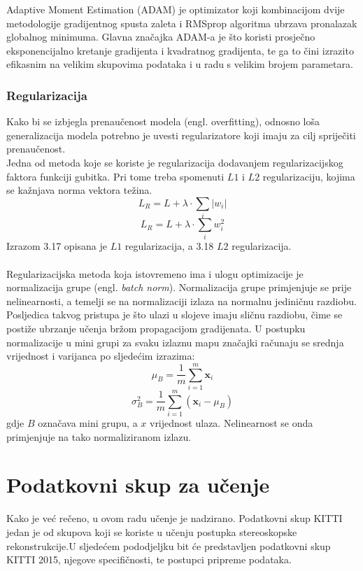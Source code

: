 \documentclass[times, utf8, zavrsni, numeric]{fer}
\begin{document}
Adaptive Moment Estimation (ADAM) je optimizator koji kombinacijom dvije metodologije gradijentnog spusta zaleta i RMSprop algoritma ubrzava pronalazak globalnog minimuma. Glavna značajka ADAM-a je što koristi prosječno eksponencijalno kretanje gradijenta i kvadratnog gradijenta, te ga to čini izrazito efikasnim na velikim skupovima podataka i u radu s velikim brojem parametara\cite{adam}.
\subsection{Regularizacija}
Kako bi se izbjegla prenaučenost modela (engl. overfitting), odnosno loša generalizacija modela potrebno je uvesti regularizatore koji imaju za cilj spriječiti prenaučenost.\\
Jedna od metoda koje se koriste je regularizacija dodavanjem regularizacijskog faktora funkciji gubitka. Pri tome treba spomenuti $L1$ i $L2$ regularizaciju, kojima se kažnjava norma vektora težina.
\begin{equation}
L_{R}= L + \lambda \cdot \sum_{i} |w_{i}|
\label{eq:Aktivacija}
\end{equation}
\begin{equation}
L_{R}= L + \lambda \cdot \sum_{i} w_{i}^2
\label{eq:Aktivacija}
\end{equation}
Izrazom 3.17 opisana je $L1$ regularizacija, a 3.18 $L2$ regularizacija.\\ \\
Regularizacijska metoda koja istovremeno ima i ulogu optimizacije je normalizacija grupe (engl. \textit{batch norm}). Normalizacija grupe primjenjuje se prije nelinearnosti, a temelji se na normalizaciji izlaza na normalnu jediničnu razdiobu. Posljedica takvog pristupa je što ulazi u slojeve imaju sličnu razdiobu, čime se postiže ubrzanje učenja bržom propagacijom gradijenata.
U postupku normalizacije u mini grupi za svaku izlaznu mapu značajki računaju se srednja vrijednost i varijanca po sljedećim izrazima:
\begin{equation}
\mu _{B} = \frac{1}{m}\sum_{i=1}^{m}\textbf{x}_{i}
\label{eq:Aktivacija}
\end{equation}
\begin{equation}
\sigma^{2} _{B} = \frac{1}{m}\sum_{i=1}^{m}\left(\textbf{x}_{i} - \mu_{B} \right)
\label{eq:Aktivacija}
\end{equation}
gdje $B$ označava mini grupu, a $x$ vrijednost ulaza.
Nelinearnost se onda primjenjuje na tako normaliziranom izlazu.
\chapter{Podatkovni skup za učenje}
Kako je već rečeno, u ovom radu učenje je nadzirano. Podatkovni skup KITTI jedan je od skupova koji se koriste u učenju postupka stereoskopske rekonstrukcije.U sljedećem pododjeljku bit će predstavljen podatkovni skup KITTI 2015, njegove specifičnosti, te postupci pripreme podataka.
\end{document}
